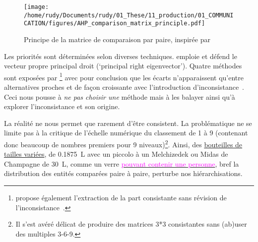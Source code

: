 \begin{figure}[htbp]
\centering
	\caption{Principe de la matrice de comparaison par paire, inspirée par \citeauthor{saaty_decision_2004}~\cite{saaty_decision_2004}}
	\texttt{[image: /home/rudy/Documents/rudy/01\_These/11\_production/01\_COMMUNICATION/figures/AHP\_comparison\_matrix\_principle.pdf]}
	\label{fig:matrix_saaty_revised}
\end{figure}
Les priorités sont déterminées selon diverses techniques.
\citeauthor{saaty_fundamentals_2004} emploie et défend le vecteur propre principal droit (`principal right eigenvector').
Quatre méthodes sont exposées par \citeauthor{ishizaka_how_2006}\footnote{\citeauthor{barzilai_consistency_1998} propose également l'extraction de la part consistante sans révision de l'inconsistance~\cite{barzilai_consistency_1998}.} avec pour conclusion que les écarts n’apparaissent qu'entre alternatives proches et de façon croissante avec l'introduction d'inconsistance~\cite{ishizaka_how_2006}.
Ceci nous pousse à \emph{ne pas choisir une} méthode mais à les balayer ainsi qu'à explorer l'inconsistance et son origine.

La réalité ne nous permet que rarement d'être consistent.
La problématique ne se limite pas à la critique de l'échelle numérique du classement de 1 à 9 (contenant donc beaucoup de nombres premiers pour 9 niveaux)\footnote{Il s'est avéré délicat de produire des matrices 3*3 consistantes sans (ab)user des multiples 3-6-9.}.
Ainsi, des  \href{https://en.wikipedia.org/wiki/Wine_bottle#Sizes}{bouteilles de tailles variées}, de 0.1875~L avec un piccolo à un Melchizedek ou Midas de Champagne de 30~L, comme un verre \href{http://thechive.com/2011/07/20/you-should-have-a-drink-worlds-biggest-beverages-16-photos/}{\textcolor{magenta}{pouvant contenir une personne}}, bref la distribution des entités comparées paire à paire, perturbe nos hiérarchisations.

